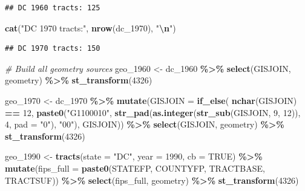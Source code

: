 \documentclass[
]{article}
\newenvironment{Shaded}{\begin{snugshade}}{\end{snugshade}}
\newcommand{\AttributeTok}[1]{\textcolor[rgb]{0.13,0.29,0.53}{#1}}
\newcommand{\CommentTok}[1]{\textcolor[rgb]{0.56,0.35,0.01}{\textit{#1}}}
\newcommand{\ConstantTok}[1]{\textcolor[rgb]{0.56,0.35,0.01}{#1}}
\newcommand{\DecValTok}[1]{\textcolor[rgb]{0.00,0.00,0.81}{#1}}
\newcommand{\FunctionTok}[1]{\textcolor[rgb]{0.13,0.29,0.53}{\textbf{#1}}}
\newcommand{\NormalTok}[1]{#1}
\newcommand{\OtherTok}[1]{\textcolor[rgb]{0.56,0.35,0.01}{#1}}
\newcommand{\SpecialCharTok}[1]{\textcolor[rgb]{0.81,0.36,0.00}{\textbf{#1}}}
\newcommand{\StringTok}[1]{\textcolor[rgb]{0.31,0.60,0.02}{#1}}
\begin{document}
\begin{verbatim}
## DC 1960 tracts: 125
\end{verbatim}

\begin{Shaded}
\begin{Highlighting}[]
\FunctionTok{cat}\NormalTok{(}\StringTok{"DC 1970 tracts:"}\NormalTok{, }\FunctionTok{nrow}\NormalTok{(dc\_1970), }\StringTok{"}\SpecialCharTok{\textbackslash{}n}\StringTok{"}\NormalTok{)}
\end{Highlighting}
\end{Shaded}

\begin{verbatim}
## DC 1970 tracts: 150
\end{verbatim}

\begin{Shaded}
\begin{Highlighting}[]
\CommentTok{\# Build all geometry sources}
\NormalTok{geo\_1960 }\OtherTok{\textless{}{-}}\NormalTok{ dc\_1960 }\SpecialCharTok{\%\textgreater{}\%} \FunctionTok{select}\NormalTok{(GISJOIN, geometry) }\SpecialCharTok{\%\textgreater{}\%} \FunctionTok{st\_transform}\NormalTok{(}\DecValTok{4326}\NormalTok{)}

\NormalTok{geo\_1970 }\OtherTok{\textless{}{-}}\NormalTok{ dc\_1970 }\SpecialCharTok{\%\textgreater{}\%}
  \FunctionTok{mutate}\NormalTok{(}\AttributeTok{GISJOIN =} \FunctionTok{if\_else}\NormalTok{(}
    \FunctionTok{nchar}\NormalTok{(GISJOIN) }\SpecialCharTok{==} \DecValTok{12}\NormalTok{,}
    \FunctionTok{paste0}\NormalTok{(}\StringTok{"G1100010"}\NormalTok{, }\FunctionTok{str\_pad}\NormalTok{(}\FunctionTok{as.integer}\NormalTok{(}\FunctionTok{str\_sub}\NormalTok{(GISJOIN, }\DecValTok{9}\NormalTok{, }\DecValTok{12}\NormalTok{)), }\DecValTok{4}\NormalTok{, }\AttributeTok{pad =} \StringTok{"0"}\NormalTok{), }\StringTok{"00"}\NormalTok{),}
\NormalTok{    GISJOIN)) }\SpecialCharTok{\%\textgreater{}\%}
  \FunctionTok{select}\NormalTok{(GISJOIN, geometry) }\SpecialCharTok{\%\textgreater{}\%} \FunctionTok{st\_transform}\NormalTok{(}\DecValTok{4326}\NormalTok{)}

\NormalTok{geo\_1990 }\OtherTok{\textless{}{-}} \FunctionTok{tracts}\NormalTok{(}\AttributeTok{state =} \StringTok{"DC"}\NormalTok{, }\AttributeTok{year =} \DecValTok{1990}\NormalTok{, }\AttributeTok{cb =} \ConstantTok{TRUE}\NormalTok{) }\SpecialCharTok{\%\textgreater{}\%}
  \FunctionTok{mutate}\NormalTok{(}\AttributeTok{fips\_full =} \FunctionTok{paste0}\NormalTok{(STATEFP, COUNTYFP, TRACTBASE, TRACTSUF)) }\SpecialCharTok{\%\textgreater{}\%}
  \FunctionTok{select}\NormalTok{(fips\_full, geometry) }\SpecialCharTok{\%\textgreater{}\%} \FunctionTok{st\_transform}\NormalTok{(}\DecValTok{4326}\NormalTok{)}


\end{Highlighting}
\end{Shaded}
\end{document}
